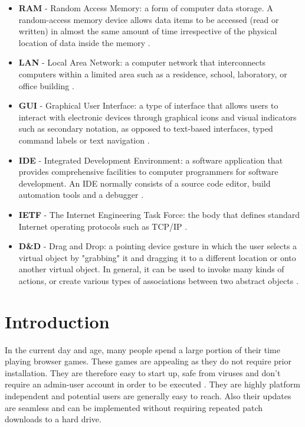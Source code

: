 \documentclass[bsc, 12pt, twoside, singlespacing, parskip, abbrevs, notimes, normalheadings, logo, deptreport]{styles/infthesis}
\begin{document}
\begin{itemize}
\item \textbf{RAM} - Random Access Memory: a form of computer data storage. A random-access memory device allows data items to be accessed (read or written) in almost the same amount of time irrespective of the physical location of data inside the memory \cite{def_RAM}.\\
\item \textbf{LAN} - Local Area Network: a computer network that interconnects computers within a limited area such as a residence, school, laboratory, or office building \cite{def_LAN}.
\item \textbf{GUI} - Graphical User Interface: a type of interface that allows users to interact with electronic devices through graphical icons and visual indicators such as secondary notation, as opposed to text-based interfaces, typed command labels or text navigation \cite{def_GUI}. 
\item \textbf{IDE} - Integrated Development Environment: a software application that provides comprehensive facilities to computer programmers for software development. An IDE normally consists of a source code editor, build automation tools and a debugger \cite{def_IDE}.
\item \textbf{IETF} - The Internet Engineering Task Force: the body that defines standard Internet operating protocols such as TCP/IP \cite{def_IETF}. 
\item \textbf{D\&D} - Drag and Drop: a pointing device gesture in which the user selects a virtual object by "grabbing" it and dragging it to a different location or onto another virtual object. In general, it can be used to invoke many kinds of actions, or create various types of associations between two abstract objects \cite{def_DND}.
\end{itemize}

\tableofcontents




\chapter{Introduction}
\setcounter{page}{1}
\vspace{-2em}
In the current day and age, many people spend a large portion of their time playing browser games. These games are appealing as they do not require prior installation. They are therefore easy to start up, safe from viruses and don't require an admin-user account in order to be executed \cite{Web_Apps_Superior}. They are highly platform independent and potential users are generally easy to reach. Also their updates are seamless and can be implemented without requiring repeated patch downloads to a hard drive.
\end{document}
